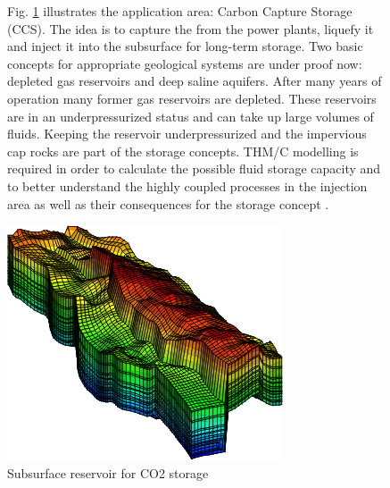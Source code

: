 \begin{figure}[!htb]
\begin{minipage}[t]{0.48\textwidth}
Fig. \ref{fig:apl2} illustrates the application area: Carbon Capture Storage (CCS). The idea is to capture the  from the power plants, liquefy it and inject it into the subsurface for long-term storage. Two basic concepts for appropriate geological systems are under proof now: depleted gas reservoirs and deep saline aquifers. After many years of operation many former gas reservoirs are depleted. These reservoirs are in an underpressurized status and can take up large volumes of fluids. Keeping the reservoir underpressurized and the impervious cap rocks are part of the storage concepts. THM/C modelling is required in order to calculate the possible fluid storage capacity and to better understand the highly coupled processes in the  injection area as well as their consequences for the storage concept \cite{GorkeEtAl:2011}.
\end{minipage}
\hspace{0.02\textwidth}
\begin{minipage}[t]{0.48\textwidth}
\vspace{2cm}
\includegraphics[scale=0.5]{figures/intro2}
\caption{Subsurface reservoir for CO2 storage}
\label{fig:apl2}
\end{minipage}
\end{figure}

\newpage

